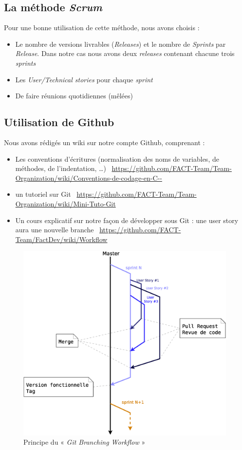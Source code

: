 \documentclass[12pt,a4paper,openany]{article}
\begin{document}
	\subsection{La méthode \textit{Scrum}}
	Pour une bonne utilisation de cette méthode, nous avons choisis : 
	\begin{itemize}
		\item Le nombre de versions livrables (\textit{Releases}) et le nombre de \textit{Sprints} par \textit{Release}. Dans notre cas nous avons
			deux \textit{releases} contenant chacune trois \textit{sprints}
		\item Les \textit{User/Technical stories} pour chaque \textit{sprint}
		\item De faire réunions quotidiennes (mêlées)
	\end{itemize}

	\subsection{Utilisation de Github}
	Nous avons rédigés un wiki sur notre compte Github, comprenant :
	\begin{itemize}
		\item Les conventions d’écritures (normalisation des noms de variables, de méthodes, de l'indentation, \ldots)\newline
			\Mundus~\url{https://github.com/FACT-Team/Team-Organization/wiki/Conventions-de-codage-en-C--}
		\item un tutoriel sur Git\newline
			\Mundus~\url{https://github.com/FACT-Team/Team-Organization/wiki/Mini-Tuto-Git}
		\item Un cours explicatif sur notre façon de développer sous Git : une user story aura une nouvelle branche \newline
			\Mundus~\url{https://github.com/FACT-Team/FactDev/wiki/Workflow}
	\end{itemize}

	\begin{figure}[H]
		\centering
		\includegraphics[width=11cm]{BranchingWorkflow.eps}
		\caption{Principe du « \textit{Git Branching Workflow} »}
	\end{figure}
\end{document}
